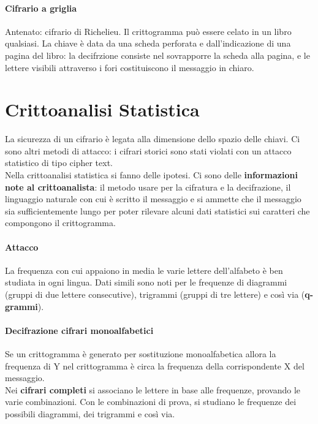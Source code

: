 \documentclass[10pt]{book}
\begin{document}
\paragraph{Cifrario a griglia} Antenato: cifrario di Richelieu. Il crittogramma può essere celato in un libro qualsiasi. La chiave è data da una scheda perforata e dall'indicazione di una pagina del libro: la decifrzione consiste nel sovrapporre la scheda alla pagina, e le lettere visibili attraverso i fori costituiscono il messaggio in chiaro.
\section{Crittoanalisi Statistica} La sicurezza di un cifrario è legata alla dimensione dello spazio delle chiavi. Ci sono altri metodi di attacco: i cifrari storici sono stati violati con un attacco statistico di tipo cipher text.\\
Nella crittoanalisi statistica si fanno delle ipotesi. Ci sono delle \textbf{informazioni note al crittoanalista}: il metodo usare per la cifratura e la decifrazione, il linguaggio naturale con cui è scritto il messaggio e si ammette che il messaggio sia sufficientemente lungo per poter rilevare alcuni dati statistici sui caratteri che compongono il crittogramma.
\paragraph{Attacco} La frequenza con cui appaiono in media le varie lettere dell'alfabeto è ben studiata in ogni lingua. Dati simili sono noti per le frequenze di diagrammi (gruppi di due lettere consecutive), trigrammi (gruppi di tre lettere) e così via (\textbf{q-grammi}).
\paragraph{Decifrazione cifrari monoalfabetici}
Se un crittogramma è generato per sostituzione monoalfabetica allora la frequenza di Y nel crittogramma è circa la frequenza della corrispondente X del messaggio.\\
Nei \textbf{cifrari completi} si associano le lettere in base alle frequenze, provando le varie combinazioni. Con le combinazioni di prova, si studiano le frequenze dei possibili diagrammi, dei trigrammi e così via.
\end{document}
